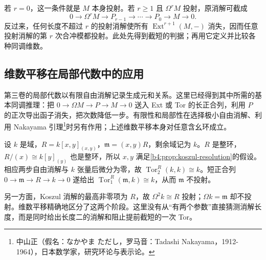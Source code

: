 若 \(r=0\)，这一条件就是 \(M\) 本身投射。若 \(r\ge1\) 且 \(\Omega^rM\) 投射，原消解可截成
\[
0\longrightarrow\Omega^rM\longrightarrow P_{r-1}\longrightarrow\cdots
\longrightarrow P_0\longrightarrow M\longrightarrow0.
\]
反过来，任何长度不超过 \(r\) 的投射消解使所有 \(\operatorname{Ext}^{r+1}(M,-)\) 消失，因而任意投射消解的第 \(r\) 次合冲模都投射。此处先得到截短的判据；再用它定义并比较各种同调维数。

\subsection{维数平移在局部代数中的应用}
\label{b4:subsec:0805:04}

第三卷的局部代数以有限自由消解记录生成元和关系。这里已经得到其中所需的基本同调推理：把 \(0\to\Omega M\to P\to M\to0\) 送入 Ext 或 Tor 的长正合列，利用 \(P\) 的正次导出函子消失，把次数降低一步。有限性和局部性在选择极小自由消解、利用 Nakayama 引理\footnote{中山正（假名：なかやま ただし，罗马音：Tadashi Nakayama，1912-1964），日本数学家，研究环论与表示论。}时另有作用；上述维数平移本身对任意含幺环成立。

\begin{example}\label{b4:exm:local-shift-koszul}
设 \(k\) 是域，\(R=k[x,y]_{(x,y)}\)，\(\mathfrak m=(x,y)R\)，剩余域记为 \(k\)。\(R\) 是整环，\(R/(x)\cong k[y]_{(y)}\) 也是整环，所以 \(x,y\) 满足\cref{b4:prop:koszul-resolution}的假设。相应两步自由消解与 \(k\) 张量后微分为零，故 \(\operatorname{Tor}_2^R(k,k)\cong k\)。短正合列 \(0\to\mathfrak m\to R\to k\to0\) 遂给出 \(\operatorname{Tor}_1^R(\mathfrak m,k)\cong k\)，从而 \(\mathfrak m\) 不投射。

\ProseParagraphBreak
另一方面，Koszul 消解的最高非零项为 \(R\)，故 \(\Omega^2k\cong R\) 投射；\(\Omega k=\mathfrak m\) 却不投射。维数平移精确地区分了这两个阶段。这里没有从“有两个参数”直接猜测消解长度，而是同时给出长度二的消解和阻止提前截短的一次 Tor。
\end{example}
